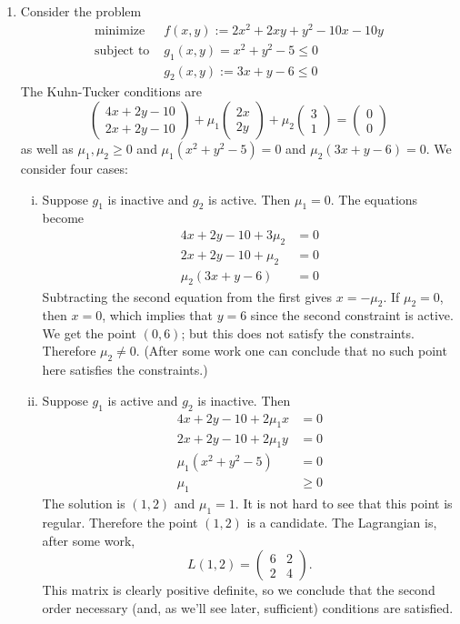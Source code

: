 \documentclass[11pt]{book}
\begin{document}
\begin{enumerate}
\item
Consider the problem
\begin{align*}
\text{minimize } &f(x,y) := 2x^2 + 2xy + y^2 - 10x - 10y \\
\text{subject to } &g_1(x,y) = x^2+y^2-5 \leq 0 \\
&g_2(x,y) := 3x+y-6 \leq 0
\end{align*}
The Kuhn-Tucker conditions are
\[
\begin{pmatrix}
4x+2y-10 \\ 2x+2y-10
\end{pmatrix} + \mu_1 \begin{pmatrix}
2x \\ 2y
\end{pmatrix} + \mu_2 \begin{pmatrix}
3 \\ 1
\end{pmatrix} = \begin{pmatrix}
0 \\ 0
\end{pmatrix}
\]
as well as $\mu_1, \mu_2 \geq 0$ and $\mu_1 (x^2+y^2-5) = 0$ and $\mu_2 (3x+y - 6) = 0$. We consider four cases:
\begin{enumerate}[(i)]
\item
Suppose $g_1$ is inactive and $g_2$ is active. Then $\mu_1 = 0$. The equations become
\begin{align*}
4x + 2y - 10  + 3\mu_2 &= 0 \\
2x + 2y - 10 + \mu_2 &= 0 \\
\mu_2 (3x+y-6) &= 0
\end{align*}
Subtracting the second equation from the first gives $x =- \mu_2$. If $\mu_2 = 0$, then $x = 0$, which implies that $y = 6$ since the second constraint is active. We get the point $(0,6)$; but this does not satisfy the constraints. Therefore $\mu_2 \neq 0$. (After some work one can conclude that no such point here satisfies the constraints.) 

\item
Suppose $g_1$ is active and $g_2$ is inactive. Then
\begin{align*}
4x + 2y - 10 + 2\mu_1 x &= 0 \\
2x + 2y - 10 + 2\mu_1 y &= 0 \\
\mu_1(x^2+y^2-5) &= 0 \\
\mu_1 &\geq 0
\end{align*}
The solution is $(1,2)$ and $\mu_1 = 1$. It is not hard to see that this point is regular. Therefore the point $(1,2)$ is a candidate. The Lagrangian is, after some work, 
\[
L(1,2) = \begin{pmatrix}
6 & 2 \\ 2 & 4
\end{pmatrix}.
\]
This matrix is clearly positive definite, so we conclude that the second order necessary (and, as we'll see later, sufficient) conditions are satisfied.


\end{enumerate}
\end{enumerate}
\end{document}
